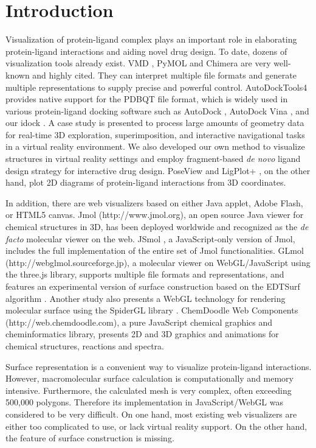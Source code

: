 \documentclass{bioinfo}
\begin{document}
\section{Introduction}

Visualization of protein-ligand complex plays an important role in elaborating protein-ligand interactions and aiding novel drug design. To date, dozens of visualization tools already exist. VMD \citep{1220}, PyMOL \citep{1221} and Chimera \citep{1219} are very well-known and highly cited. They can interpret multiple file formats and generate multiple representations to supply precise and powerful control. AutoDockTools4 \citep{596} provides native support for the PDBQT file format, which is widely used in various protein-ligand docking software such as AutoDock \citep{596}, AutoDock Vina \citep{595}, and our idock \citep{1153}. A case study \citep{1321} is presented to process large amounts of geometry data for real-time 3D exploration, superimposition, and interactive navigational tasks in a virtual reality environment. We also developed our own method \citep{1265} to visualize structures in virtual reality settings and employ fragment-based \textit{de novo} ligand design strategy for interactive drug design. PoseView \citep{748} and LigPlot+ \citep{951}, on the other hand, plot 2D diagrams of protein-ligand interactions from 3D coordinates.

In addition, there are web visualizers based on either Java applet, Adobe Flash, or HTML5 canvas. Jmol (http://www.jmol.org), an open source Java viewer for chemical structures in 3D, has been deployed worldwide and recognized as the \textit{de facto} molecular viewer on the web. JSmol \citep{1314}, a JavaScript-only version of Jmol, includes the full implementation of the entire set of Jmol functionalities. GLmol (http://webglmol.sourceforge.jp), a molecular viewer on WebGL/JavaScript using the three.js library, supports multiple file formats and representations, and features an experimental version of surface construction based on the EDTSurf algorithm \citep{1297,1350}. Another study \citep{1262} also presents a WebGL technology for rendering molecular surface using the SpiderGL library \citep{1320}. ChemDoodle Web Components (http://web.chemdoodle.com), a pure JavaScript chemical graphics and cheminformatics library, presents 2D and 3D graphics and animations for chemical structures, reactions and spectra.

Surface representation is a convenient way to visualize protein-ligand interactions. However, macromolecular surface calculation is computationally and memory intensive. Furthermore, the calculated mesh is very complex, often exceeding 500,000 polygons. Therefore its implementation in JavaScript/WebGL was considered to be very difficult. On one hand, most existing web visualizers are either too complicated to use, or lack virtual reality support. On the other hand, the feature of surface construction is missing.
\end{document}

